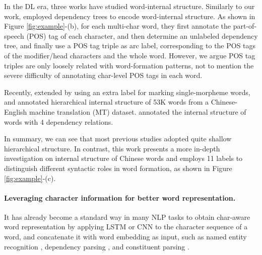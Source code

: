 
In the DL era, three works have 
studied 
word-internal structure. 
Similarly to our work, \citet{li-etal-aaai-2018-zhaohai} employed dependency trees to encode word-internal structure. 
As shown in Figure \ref{fig:example}-(b), for each multi-char word, they first annotate the part-of-speech (POS) tag of each character, and then determine an unlabeled dependency tree, and finally use a POS tag triple as arc label, corresponding to the POS tags of the modifier/head characters and the whole word.  
However, we argue POS tag triples 
are only loosely related with word-formation patterns, 
not to mention the severe difficulty of annotating 
char-level POS tags in each word. 


Recently, \citet{linqian2020} extended \citet{zhang-etal-2014-char} by using an extra label for marking single-morpheme %
words, and annotated hierarchical internal structure of 53K words from a Chinese-English machine translation (MT) dataset. 
\citet{annotate-syntactic-Depling-2019} annotated the internal structure of words with 4 dependency relations. 


In summary, we can see that most previous studies adopted quite shallow hierarchical structure. In contrast, 
this work %
presents a more in-depth investigation on internal structure of Chinese words and employs 11 labels to distinguish different syntactic roles in word formation, as shown in Figure \ref{fig:example}-(c).




\paragraph{Leveraging character information for better word representation.} 
It has already become a standard way in many NLP tasks to obtain char-aware word representation by applying LSTM or CNN to the character sequence of a word, and concatenate it with word embedding as input, such as named entity recognition \cite{chiu2016named}, dependency parsing \cite{zhang-etal-2020-dep}, and constituent parsing \cite{gaddy2018s}.

